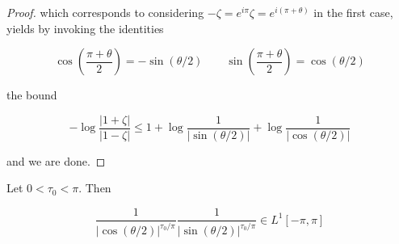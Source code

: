 \begin{proof}
	which corresponds to considering $-\zeta = e^{i\pi}\zeta = e^{i(\pi + \theta)}$ in the first case, yields by invoking the identities

	\begin{equation*}
		\cos\left( \frac{\pi + \theta}{2}\right) = -\sin(\theta/2) \qquad \sin\left( \frac{\pi + \theta}{2} \right) = \cos(\theta/2)
	\end{equation*}

	the bound 

	\begin{equation*}
		-\log \frac{\left| 1 + \zeta \right|}{\left| 1 - \zeta \right|} \leq 1 + \log \frac{1}{\left| \sin(\theta/2)\right|} + \log \frac{1}{\left| \cos(\theta/2)\right|}	 
	\end{equation*}

	and we are done.
\end{proof}

\begin{lemma}
	Let $0 < \tau_0 < \pi$. Then 

	\begin{equation*}
		\frac{1}{\left| \cos(\theta/2) \right|^{\tau_0/\pi}}\frac{1}{\left| \sin(\theta/2) \right|^{\tau_0/\pi}} \in L^1[-\pi,\pi]
	\end{equation*}
\end{lemma}

